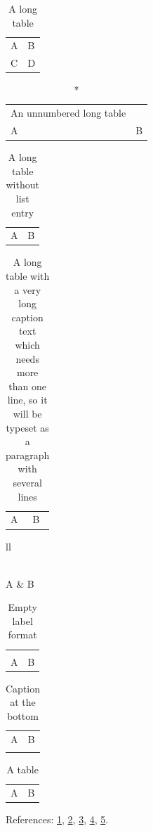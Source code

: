 \documentclass{article}
\begin{document}
\listoftables

\begin{longtable}{ll}
  \caption{A long table}\label{tab:a}\\
  A & B \\
  C & D \\
\end{longtable}

\begin{longtable}{ll}
  \caption*{An unnumbered long table}\\
  A & B \\
\end{longtable}

\begin{longtable}{ll}
  \caption[]{A long table without list entry}\label{tab:c}\\
  A & B \\
\end{longtable}

\begin{longtable}{ll}
  \caption[Short]{A long table with a very long caption text which needs more than
    one line, so it will be typeset as a paragraph with several lines}\label{tab:d}\\
  A & B \\
\end{longtable}

\begin{longtable*}{ll}
  \caption*{A longtable* caption}\\
  A & B \\
\end{longtable*}

\begin{longtable}{ll}
  \captionsetup{labelformat=empty}
  \caption{Empty label format}\\
  A & B \\
\end{longtable}

\begin{longtable}{ll}
  A & B \\
  \caption{Caption at the bottom}\label{tab:g}
\end{longtable}

\begin{table}[h]
  \centering
  \caption{A table}\label{tab:h}
  \begin{tabular}{ll} A & B \end{tabular}
\end{table}

References: \ref{tab:a}, \ref{tab:c}, \ref{tab:d}, \ref{tab:g}, \ref{tab:h}.
\end{document}
